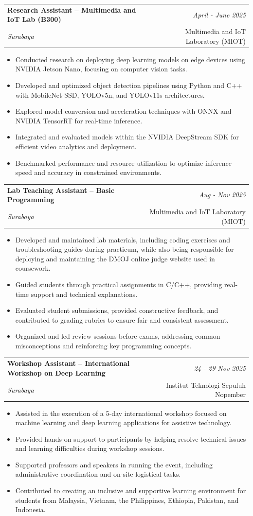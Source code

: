 \documentclass[a4paper,11pt]{article}
\makeatletter
\newcommand{\resumeSubheading}[4]{
\vspace{0.5mm}\item
    \begin{tabular*}{0.98\textwidth}[t]{l@{\extracolsep{\fill}}r}
        \textbf{#1} & \textit{\footnotesize{#4}} \\
        \textit{\footnotesize{#3}} &  \footnotesize{#2}\\
    \end{tabular*}
    \vspace{-2.4mm}
}
\newcommand{\resumeItemListStart}{\begin{justify}\begin{itemize}[leftmargin=3ex, rightmargin=2ex, noitemsep,labelsep=1.2mm,itemsep=0mm]\small}
\newcommand{\resumeItemListEnd}{\end{itemize}\end{justify}\vspace{-2mm}}
\makeatother
\begin{document}
\resumeSubheading
{Research Assistant – Multimedia and IoT Lab (B300)}{Multimedia and IoT Laboratory (MIOT)}
{Surabaya}{April \-- June 2025}
\resumeItemListStart
\item {Conducted research on deploying deep learning models on edge devices using NVIDIA Jetson Nano, focusing on computer vision tasks.}
\item {Developed and optimized object detection pipelines using Python and C++ with MobileNet\--SSD, YOLOv5n, and YOLOv11s architectures.}
\item {Explored model conversion and acceleration techniques with ONNX and NVIDIA TensorRT for real\--time inference.}
\item {Integrated and evaluated models within the NVIDIA DeepStream SDK for efficient video analytics and deployment.}
\item {Benchmarked performance and resource utilization to optimize inference speed and accuracy in constrained environments.}
\resumeItemListEnd
\clearpage
\resumeSubheading
{Lab Teaching Assistant – Basic Programming}{Multimedia and IoT Laboratory (MIOT)}
{Surabaya}{Aug \-- Nov 2025}
\resumeItemListStart
\item {Developed and maintained lab materials, including coding exercises and troubleshooting guides during practicum, while also being responsible for deploying and maintaining the DMOJ online judge website used in coursework.}
\item {Guided students through practical assignments in C/C++, providing real\--time support and technical explanations.}
\item {Evaluated student submissions, provided constructive feedback, and contributed to grading rubrics to ensure fair and consistent assessment.}
\item {Organized and led review sessions before exams, addressing common misconceptions and reinforcing key programming concepts.}
\resumeItemListEnd

\resumeSubheading
{Workshop Assistant – International Workshop on Deep Learning}
{Institut Teknologi Sepuluh Nopember}{Surabaya}
{24 \-- 29 Nov 2025}

\resumeItemListStart
\item {Assisted in the execution of a 5\--day international workshop focused on machine learning and deep learning applications for assistive technology.}
\item {Provided hands\--on support to participants by helping resolve technical issues and learning difficulties during workshop sessions.}
\item {Supported professors and speakers in running the event, including administrative coordination and on\--site logistical tasks.}
\item {Contributed to creating an inclusive and supportive learning environment for students from Malaysia, Vietnam, the Philippines, Ethiopia, Pakistan, and Indonesia.}
\resumeItemListEnd
\end{document}
